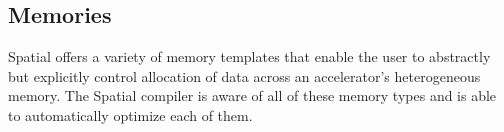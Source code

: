





\subsection{Memories}
Spatial offers a variety of memory templates that enable the user to abstractly but explicitly control allocation of data across an accelerator's heterogeneous memory.
The Spatial compiler is aware of all of these memory types and is able to automatically optimize each of them. 

